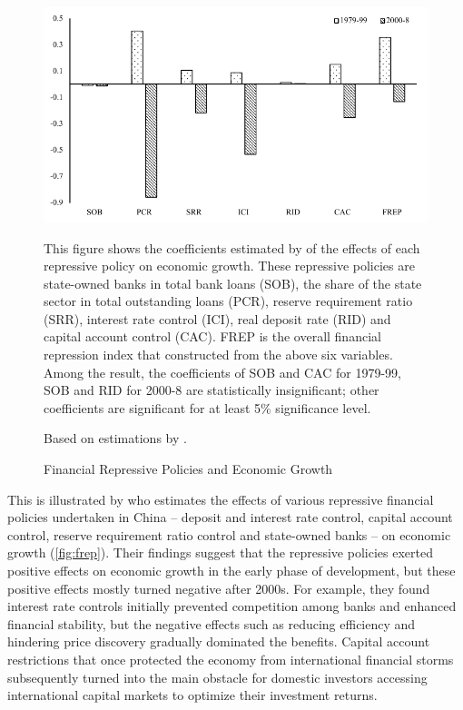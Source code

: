 \documentclass[AER]{AEA}
\begin{document}
\begin{figure}[!htb]
\centering
\includegraphics[scale=0.9]{fig/frep.pdf}
\caption{Financial Repressive Policies and Economic Growth}
\begin{figurenotes}
This figure shows the coefficients estimated by \cite{huang2011} of the effects  
of each repressive policy on economic growth. These repressive policies are 
state-owned banks in total bank loans (SOB), the share of the state sector in 
total outstanding loans (PCR), reserve requirement ratio (SRR), interest rate 
control (ICI), real deposit rate (RID) and capital account control (CAC).
FREP is the overall financial repression index that constructed from the above 
six variables. Among the result, the coefficients of SOB and CAC for 1979-99, 
SOB and RID for 2000-8 are statistically insignificant; other coefficients 
are significant for at least 5\% significance level.
\end{figurenotes}
\begin{figurenotes}[Source]
Based on estimations by \cite{huang2011}.
\end{figurenotes}
\label{fig:frep}
\end{figure}

This is illustrated by \cite{huang2011} who estimates the effects of various 
repressive financial policies undertaken in China -- 
deposit and interest rate control, capital account control,
reserve requirement ratio control and state-owned banks -- on economic growth 
(\autoref{fig:frep}).
Their findings suggest that the repressive policies exerted positive effects 
on economic growth in the early phase of development, but these positive effects 
mostly turned negative after 2000s. For example, they found interest rate controls  
initially prevented competition among banks and enhanced financial stability, 
but the negative effects such as reducing efficiency and hindering price 
discovery gradually dominated the benefits. Capital account restrictions that 
once protected the economy from international financial storms subsequently 
turned into the main obstacle for domestic investors accessing international 
capital markets to optimize their investment returns. 
\end{document}
